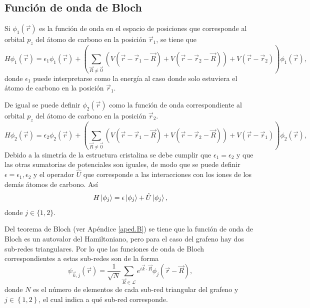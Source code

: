 \subsection{Función de onda de Bloch}
Si $\phi_1(\vec{r})$ es la función de onda en el espacio de posiciones que corresponde al orbital $p_z$ del átomo de carbono en la posición $\vec{r}_1$, se tiene que
\begin{equation}
	H\phi_1(\vec{r}) = \epsilon_1\phi_1(\vec{r}) + \left(\sum_{\vec{R} \neq \vec{0}}\left(V(\vec{r} - \vec{r}_1 - \vec{R})+ V(\vec{r} - \vec{r}_2 - \vec{R})\right) + V(\vec{r}-\vec{r}_2)\right)\phi_1(\vec{r}),
\end{equation}
donde $\epsilon_1$ puede interpretarse como la energía al caso donde solo estuviera el átomo de carbono en la posición $\vec{r}_1$.\par
De igual se puede definir $\phi_2(\vec{r})$ como la función de onda correspondiente al orbital $p_z$ del átomo de carbono en la posición $\vec{r}_2$. 
\begin{equation}
	H\phi_2(\vec{r}) = \epsilon_2\phi_2(\vec{r}) + \left(\sum_{\vec{R} \neq \vec{0}}\left(V(\vec{r} - \vec{r}_1 - \vec{R})+ V(\vec{r} - \vec{r}_2 - \vec{R})\right) + V(\vec{r}-\vec{r}_1)\right)\phi_2(\vec{r}),
\end{equation}
Debido a la simetría de la estructura cristalina se debe cumplir que $\epsilon_1 = \epsilon_2$ y que las otras sumatorias de potenciales son iguales, de modo que se puede definir $\epsilon = \epsilon_1, \epsilon_2$ y el operador $\hat{U}$ que corresponde a las interacciones con los iones de los demás átomos de carbono. Así
\begin{equation}
H \ket{\phi_j} = \epsilon \ket{\phi_j} + \hat{U}\ket{\phi_j},\label{eq:tightapp}
\end{equation}
donde $j \in \{1,2\}$.\par 
Del teorema de Bloch (ver Apéndice \ref{aped.B}) se tiene que la función de onda de Bloch es un autovalor del Hamiltoniano, pero para el caso del grafeno hay dos sub-redes triangulares. Por lo que las funciones de onda de Bloch correspondientes a estas sub-redes son de la forma
\begin{equation}
	\psi_{\vec{k},j}(\vec{r}) = \frac{1}{\sqrt{N}}\sum_{\vec{R}\in \mathcal{L}} e^{i \vec{k}\cdot \vec{R}}\phi_{j}(\vec{r} - \vec{R}),
\end{equation}
donde $N$ es el número de elementos de cada sub-red triangular del grafeno y $j \in \left\{1,2\right\}$, el cual indica a qué sub-red corresponde.\\
